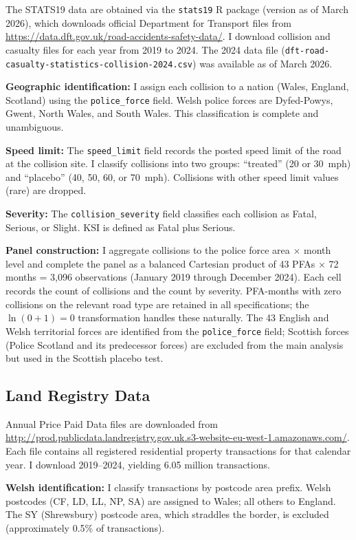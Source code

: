 \documentclass[12pt]{article}
\begin{document}
The STATS19 data are obtained via the \texttt{stats19} R package (version as of March 2026), which downloads official Department for Transport files from \url{https://data.dft.gov.uk/road-accidents-safety-data/}. I download collision and casualty files for each year from 2019 to 2024. The 2024 data file (\texttt{dft-road-casualty-statistics-collision-2024.csv}) was available as of March 2026.

\textbf{Geographic identification:} I assign each collision to a nation (Wales, England, Scotland) using the \texttt{police\_force} field. Welsh police forces are Dyfed-Powys, Gwent, North Wales, and South Wales. This classification is complete and unambiguous.

\textbf{Speed limit:} The \texttt{speed\_limit} field records the posted speed limit of the road at the collision site. I classify collisions into two groups: ``treated'' (20 or 30~mph) and ``placebo'' (40, 50, 60, or 70~mph). Collisions with other speed limit values (rare) are dropped.

\textbf{Severity:} The \texttt{collision\_severity} field classifies each collision as Fatal, Serious, or Slight. KSI is defined as Fatal plus Serious.

\textbf{Panel construction:} I aggregate collisions to the police force area $\times$ month level and complete the panel as a balanced Cartesian product of 43 PFAs $\times$ 72 months = 3,096 observations (January 2019 through December 2024). Each cell records the count of collisions and the count by severity. PFA-months with zero collisions on the relevant road type are retained in all specifications; the $\ln(0+1) = 0$ transformation handles these naturally. The 43 English and Welsh territorial forces are identified from the \texttt{police\_force} field; Scottish forces (Police Scotland and its predecessor forces) are excluded from the main analysis but used in the Scottish placebo test.

\subsection{Land Registry Data}

Annual Price Paid Data files are downloaded from \url{http://prod.publicdata.landregistry.gov.uk.s3-website-eu-west-1.amazonaws.com/}. Each file contains all registered residential property transactions for that calendar year. I download 2019--2024, yielding 6.05 million transactions.

\textbf{Welsh identification:} I classify transactions by postcode area prefix. Welsh postcodes (CF, LD, LL, NP, SA) are assigned to Wales; all others to England. The SY (Shrewsbury) postcode area, which straddles the border, is excluded (approximately 0.5\% of transactions).
\end{document}
